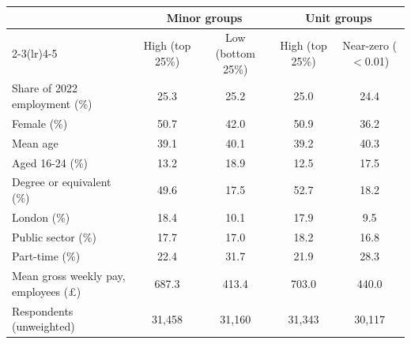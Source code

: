 \begin{tabular}{lcccc}
\toprule
 & \multicolumn{2}{c}{Minor groups} & \multicolumn{2}{c}{Unit groups} \\
\cmidrule(lr){2-3}\cmidrule(lr){4-5}
 & High (top 25\%) & Low (bottom 25\%) & High (top 25\%) & Near-zero ($<$0.01) \\
\midrule
Share of 2022 employment (\%) & 25.3 & 25.2 & 25.0 & 24.4 \\
Female (\%) & 50.7 & 42.0 & 50.9 & 36.2 \\
Mean age & 39.1 & 40.1 & 39.2 & 40.3 \\
Aged 16-24 (\%) & 13.2 & 18.9 & 12.5 & 17.5 \\
Degree or equivalent (\%) & 49.6 & 17.5 & 52.7 & 18.2 \\
London (\%) & 18.4 & 10.1 & 17.9 & 9.5 \\
Public sector (\%) & 17.7 & 17.0 & 18.2 & 16.8 \\
Part-time (\%) & 22.4 & 31.7 & 21.9 & 28.3 \\
Mean gross weekly pay, employees (\pounds) & 687.3 & 413.4 & 703.0 & 440.0 \\
Respondents (unweighted) & 31,458 & 31,160 & 31,343 & 30,117 \\
\bottomrule
\end{tabular}
